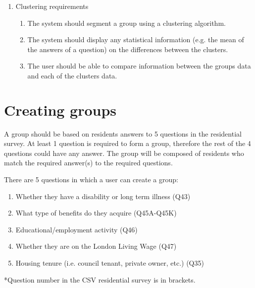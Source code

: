\begin{enumerate}
\begin{enumerate}
		\item 1.	The main data used in the visualizations should be the CSV of Lambeth\textquotesingle s Residential Survey and its Code Translation.
	\end{enumerate}
	\item Clustering requirements
	\begin{enumerate}
		\item The system should segment a group using a clustering algorithm.
		\item The system should display any statistical information (e.g. the mean of the answers of a question) on the differences between the clusters.
		\item The user should be able to compare information between the group\textquotesingle s data and each of the clusters\textsc{} data.
	\end{enumerate}
\end{enumerate}


\section{Creating groups} \label{creating_groups}
A group should be based on residents\textsc{} answers to 5 questions in the residential survey. At least 1 question is required to form a group, therefore the rest of the 4 questions could have any answer. The group will be composed of residents who match the required answer(s) to the required questions.\par

There are 5 questions in which a user can create a group:

\begin{enumerate}
	\item Whether they have a disability or long term illness (Q43)

	\item What type of benefits do they acquire (Q45A-Q45K)
	\item Educational/employment activity (Q46)
	\item Whether they are on the London Living Wage (Q47)
	\item Housing tenure (i.e. council tenant, private owner, etc.) (Q35)
\end{enumerate}

*Question number in the CSV residential survey is in brackets.


